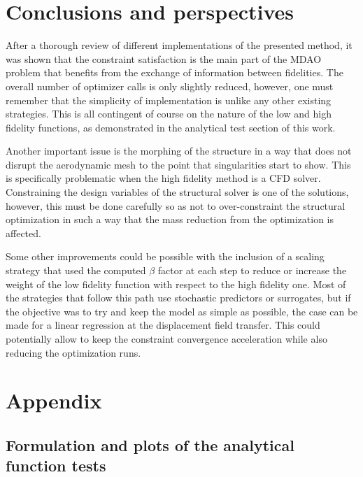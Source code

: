 \documentclass[conf]{new-aiaa}
\begin{document}
\section{Conclusions and perspectives}
\label{sec:conclusions}
After a thorough review of different implementations of the presented method, it was shown that the constraint satisfaction is the main part of the MDAO problem that benefits from the exchange of information between fidelities. The overall number of optimizer calls is only slightly reduced, however, one must remember that the simplicity of implementation is unlike any other existing strategies. This is all contingent of course on the nature of the low and high fidelity functions, as demonstrated in the analytical test section of this work. \par
Another important issue is the morphing of the structure in a way that does not disrupt the aerodynamic mesh to the point that singularities start to show. This is specifically problematic when the high fidelity method is a CFD solver. Constraining the design variables of the structural solver is one of the solutions, however, this must be done carefully so as not to over-constraint the structural optimization in such a way that the mass reduction from the optimization is affected. \par
Some other improvements could be possible with the inclusion of a scaling strategy that used the computed $\beta$ factor at each step to reduce or increase the weight of the low fidelity function with respect to the high fidelity one. Most of the strategies that follow this path use stochastic predictors or surrogates, but if the objective was to try and keep the model as simple as possible, the case can be made for a linear regression at the displacement field transfer. This could potentially allow to keep the constraint convergence acceleration while also reducing the optimization runs.


\section*{Appendix}

\subsection{Formulation and plots of the analytical function tests}
\label{subsec:formulplots}
\end{document}
